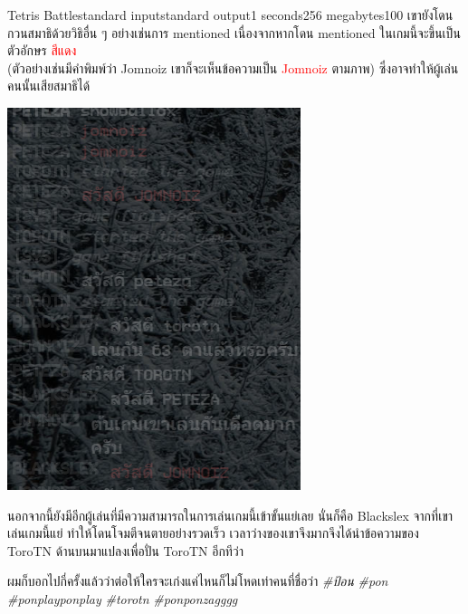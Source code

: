 \documentclass[11pt,a4paper]{article}
\begin{document}
\begin{problem}{Tetris Battle}{standard input}{standard output}{1 seconds}{256 megabytes}{100}
เขายังโดนกวนสมาธิด้วยวิธิอื่น ๆ อย่างเช่นการ mentioned เนื่องจากหากโดน mentioned ในเกมนี้จะขึ้นเป็นตัวอักษร \textcolor{red}{สีแดง} \\(ตัวอย่างเช่นมีคำพิมพ์ว่า Jomnoiz เขาก็จะเห็นข้อความเป็น \textcolor{red}{Jomnoiz} ตามภาพ) ซึ่งอาจทำให้ผู้เล่นคนนั้นเสียสมาธิได้

\begin{center}
    \includegraphics[scale=0.3]{10-tetris battle/tetris-chat.png}
\end{center}

นอกจากนี้ยังมีอีกผู้เล่นที่มีความสามารถในการเล่นเกมนี้เข้าขั้นแย่เลย นั่นก็คือ Blackslex จากที่เขาเล่นเกมนี้แย่ ทำให้โดนโจมตีจนตายอย่างรวดเร็ว เวลาว่างของเขาจึงมากจึงได้นำข้อความของ ToroTN ด้านบนมาแปลงเพื่อปั่น ToroTN อีกทีว่า

\begin{center}
    ผมก็บอกไปกี่ครั้งแล้วว่าต่อให้ใครจะเก่งแค่ไหนก็ไม่โหดเท่าคนที่ชื่อว่า \emph{\#ป้อน} \emph{\#pon} \emph{\#ponplayponplay} \emph{\#torotn} \emph{\#ponponzagggg}
\end{center}


\end{problem}
\end{document}
